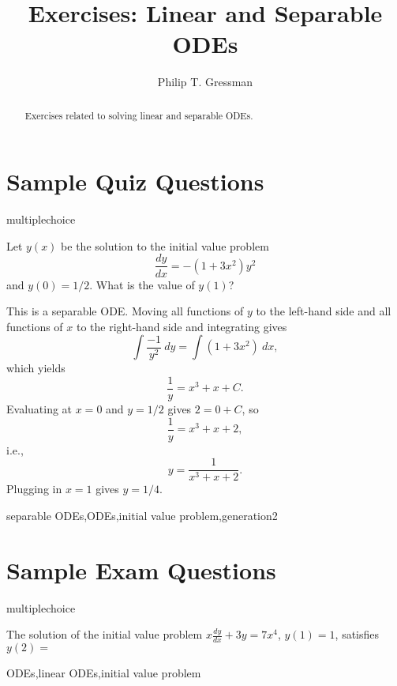 \documentclass{ximera}
\title{Exercises: Linear and Separable ODEs}
\author{Philip T. Gressman}
\begin{document}
\begin{abstract}
Exercises related to solving linear and separable ODEs.
\end{abstract}
\maketitle

\section*{Sample Quiz Questions}

\begin{question}[SepIVP001]
\begin{type}
multiplechoice
\end{type}
Let \(y(x)\) be the solution to the initial value problem \[  \frac{dy}{dx}  = -(1 + 3 x^2)y^2\] and \(y(0) = 1/2\).  What is the value of \(y(1)\)?
\begin{multiplechoice}
\end{multiplechoice}
\begin{feedback}
This is a separable ODE. Moving all functions of \(y\) to the left-hand side and all functions of \(x\) to the right-hand side and integrating gives \[\int  \frac{ -1  }{ y^2} ~ dy = \int (1 + 3 x^2) ~ dx, \] which yields \[\frac{1}{y} = x^3 + x + C.\] Evaluating at \(x = 0\) and \(y = 1/2\) gives \(2 = 0 + C\), so \[\frac{1}{y} = x^3 + x + 2,\] i.e., \[y = \frac{1}{x^3 + x + 2}.\] Plugging in \(x = 1\) gives \(y = 1/4\).
\end{feedback}
\begin{keywords}
separable ODEs,ODEs,initial value problem,generation2
\end{keywords}
\end{question}

\section*{Sample Exam Questions}

\begin{question}[2015C.06]
\begin{type}
multiplechoice
\end{type}
The solution of the initial value problem \(\displaystyle x \frac{dy}{dx} + 3y = 7 x^4\),  \(y(1) = 1\),
satisfies \(y(2) = \)
\begin{multiplechoice}
\end{multiplechoice}
\begin{keywords}
ODEs,linear ODEs,initial value problem
\end{keywords}
\end{question}
\end{document}
